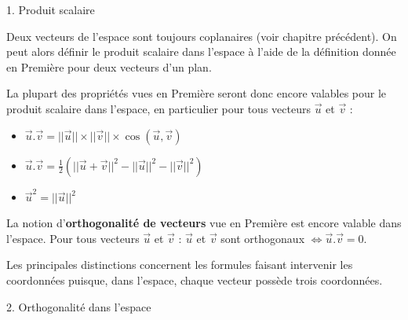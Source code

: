
\begin{h2}1. Produit scalaire\end{h2}
Deux vecteurs de l'espace sont toujours coplanaires (voir chapitre précédent). On peut alors définir le produit scalaire dans l'espace à l'aide de la définition donnée en Première pour deux vecteurs d'un plan.
\par
La plupart des propriétés vues en Première seront donc encore valables pour le produit scalaire dans l'espace, en particulier pour tous vecteurs $\vec{u}$ et $\vec{v}$ :
\begin{itemize}
     \item $\vec{u}.\vec{v}=||\vec{u}||\times ||\vec{v}||\times  \cos\left(\vec{u}, \vec{v}\right)$
     \item $\vec{u}.\vec{v}=\frac{1}{2} \left(||\vec{u}+\vec{v}||^{2}-||\vec{u}||^{2}-||\vec{v}||^{2}\right)$
     \item $\vec{u}^{2} = ||\vec{u}||^{2}$
\end{itemize}
La notion d'\textbf{orthogonalité de vecteurs} vue en Première est encore valable dans l'espace. Pour tous vecteurs $\vec{u}$ et $\vec{v}$ : $\vec{u}$ et $\vec{v}$ sont orthogonaux  $ \Leftrightarrow   \vec{u}.\vec{v}=0$.
\par
Les principales distinctions concernent les formules faisant intervenir les coordonnées puisque, dans l'espace, chaque vecteur possède trois coordonnées.
\begin{h2}2. Orthogonalité dans l'espace\end{h2}

